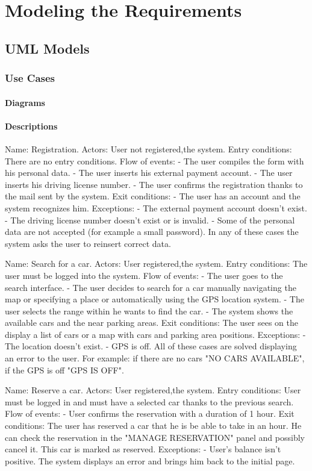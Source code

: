 \documentclass[11pt,a4paper]{report}
\begin{document}
\chapter{Modeling the Requirements}

\section{UML Models}
\subsection{Use Cases}
\subsubsection{Diagrams}
\subsubsection{Descriptions}
Name: Registration.
Actors: User not registered,the system.
Entry conditions: There are no entry conditions.
Flow of events:
- The user compiles the form with his personal data.
- The user inserts his external payment account.
- The user inserts his driving license number.
- The user confirms the registration thanks to the mail sent by the system.
Exit conditions:
- The user has an account and the system recognizes him.
Exceptions:
- The external payment account doesn't exist.
- The driving license number doesn't exist or is invalid.
- Some of the personal data are not accepted (for example a small password).
In any of these cases the system asks the user to reinsert correct data.


Name: Search for a car.
Actors: User registered,the system.
Entry conditions: The user must be logged into the system.
Flow of events:
- The user goes to the search interface.
- The user decides to search for a car manually navigating the map or specifying a place or automatically using the GPS location system.
- The user selects the range within he wants to find the car.
- The system shows the available cars and the near parking areas.
Exit conditions: The user sees on the display a list of cars or a map with cars and parking area positions.
Exceptions:
- The location doesn't exist.
- GPS is off.
All of these cases are solved displaying an error to the user. 
For example: if there are no cars "NO CARS AVAILABLE", if the GPS is off "GPS IS OFF".


Name: Reserve a car.
Actors: User registered,the system.
Entry conditions: User must be logged in and must have a selected car  thanks to the previous search.
Flow of events:
- User confirms the reservation with a duration of 1 hour.
Exit conditions: The user has reserved a car that he is be able to take in an hour. He can check the reservation in the "MANAGE RESERVATION" panel and possibly cancel it. This car is marked as reserved.
Exceptions:
- User's balance isn't positive.
The system displays an error and brings him back to the initial page.
\end{document}

